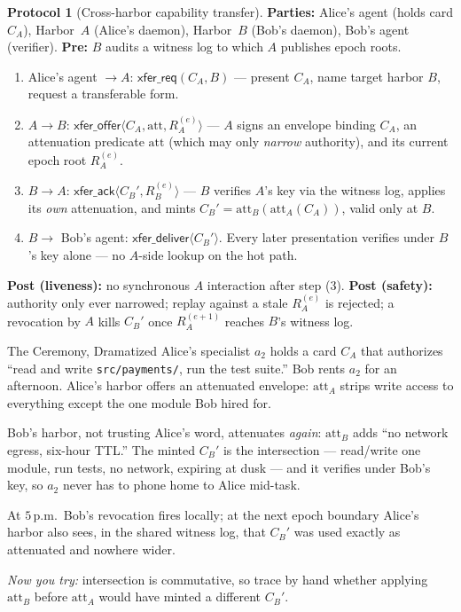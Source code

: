 \documentclass[11pt,a4paper]{article}
\theoremstyle{definition}
\theoremstyle{definition}
\newtheorem{protocol}{Protocol}[section]
\theoremstyle{remark}
\begin{document}
\ifpdbook\else
\begin{protocol}[Cross-harbor capability transfer]\label{prot:xfer}
\textbf{Parties:} Alice's agent (holds card $C_A$), Harbor~$A$ (Alice's daemon),
Harbor~$B$ (Bob's daemon), Bob's agent (verifier). \textbf{Pre:} $B$ audits a
witness log to which $A$ publishes epoch roots.
\begin{enumerate}[leftmargin=2.0em,itemsep=1pt,topsep=2pt]
  \item Alice's agent $\to A$: $\mathsf{xfer\_req}(C_A, B)$ --- present $C_A$, name
    target harbor $B$, request a transferable form.
  \item $A \to B$: $\mathsf{xfer\_offer}\langle C_A, \mathrm{att}, R_A^{(e)}\rangle$
    --- $A$ signs an envelope binding $C_A$, an attenuation predicate
    $\mathrm{att}$ (which may only \emph{narrow} authority), and its current epoch
    root $R_A^{(e)}$.
  \item $B \to A$: $\mathsf{xfer\_ack}\langle C_B', R_B^{(e)}\rangle$ --- $B$
    verifies $A$'s key via the witness log, applies its \emph{own} attenuation, and
    mints $C_B' = \mathrm{att}_B(\mathrm{att}_A(C_A))$, valid only at $B$.
  \item $B \to$ Bob's agent: $\mathsf{xfer\_deliver}\langle C_B'\rangle$. Every
    later presentation verifies under $B$'s key alone --- no $A$-side lookup on the
    hot path.
\end{enumerate}
\textbf{Post (liveness):} no synchronous $A$ interaction after step (3).
\textbf{Post (safety):} authority only ever narrowed; replay against a stale
$R_A^{(e)}$ is rejected; a revocation by $A$ kills $C_B'$ once $R_A^{(e+1)}$ reaches
$B$'s witness log.
\end{protocol}
\fi

\begin{pdexample}{The Ceremony, Dramatized}
\setlength{\parskip}{4pt plus 1pt}
Alice's specialist $a_2$ holds a card $C_A$
that authorizes ``read and write \texttt{src/payments/}, run the test suite.'' Bob
rents $a_2$ for an afternoon. Alice's harbor offers an attenuated envelope:
$\mathrm{att}_A$ strips write access to everything except the one module Bob hired
for.

Bob's harbor, not trusting Alice's word, attenuates \emph{again}:
$\mathrm{att}_B$ adds ``no network egress, six-hour TTL.'' The minted $C_B'$ is the
intersection --- read/write one module, run tests, no network, expiring at dusk ---
and it verifies under Bob's key, so $a_2$ never has to phone home to Alice mid-task.

At $5$\,p.m.\ Bob's revocation fires locally; at the next epoch boundary Alice's
harbor also sees, in the shared witness log, that $C_B'$ was used exactly as
attenuated and nowhere wider.

\emph{Now you try:} intersection is commutative,
so trace by hand whether applying $\mathrm{att}_B$ before $\mathrm{att}_A$
would have minted a different $C_B'$.
\end{pdexample}
\end{document}
